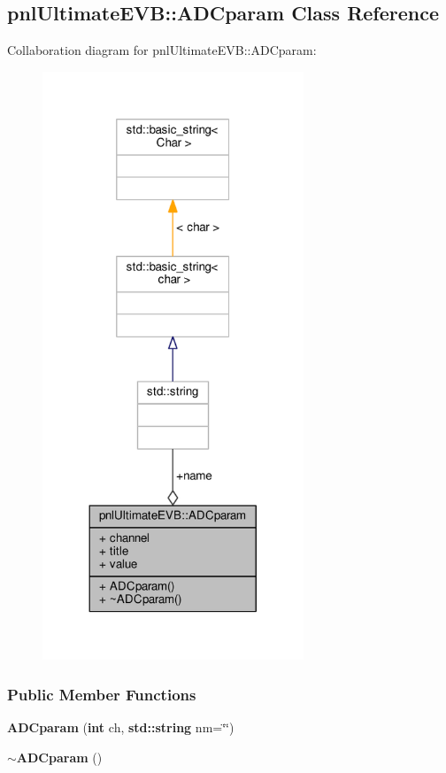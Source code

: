 \subsection{pnl\+Ultimate\+E\+VB\+:\+:A\+D\+Cparam Class Reference}
\label{classpnlUltimateEVB_1_1ADCparam}


Collaboration diagram for pnl\+Ultimate\+E\+VB\+:\+:A\+D\+Cparam\+:
\nopagebreak
\begin{figure}[H]
\begin{center}
\leavevmode
\includegraphics[width=221pt]{d7/da0/classpnlUltimateEVB_1_1ADCparam__coll__graph}
\end{center}
\end{figure}
\subsubsection*{Public Member Functions}
\begin{DoxyCompactItemize}
\item 
{\bf A\+D\+Cparam} ({\bf int} ch, {\bf std\+::string} nm=\char`\"{}\char`\"{})
\item 
{\bf $\sim$\+A\+D\+Cparam} ()
\end{DoxyCompactItemize}
